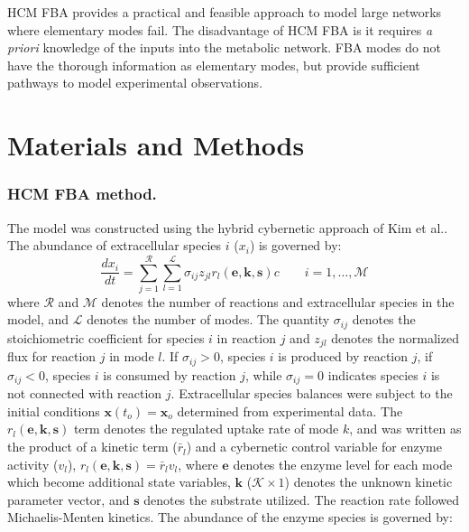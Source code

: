 \documentclass[10pt,twocolumn,twoside,final]{IEEEtran}
\begin{document}
HCM FBA provides a practical and feasible approach to model large networks where elementary modes fail.
The disadvantage of HCM FBA is it requires \textit{a priori} knowledge of the inputs into the metabolic network.
FBA modes do not have the thorough information as elementary modes, but provide sufficient pathways to model experimental observations.

\section{Materials and Methods}

\noindent\subsubsection*{HCM FBA method.}
The model was constructed using the hybrid cybernetic approach of Kim et al.\cite{2008_kim_varner_ramkrishna_BiotechProg}.
The abundance of extracellular species $i$ ($x_{i}$) is governed by:
\begin{equation}
	\frac{dx_{i}}{dt}  =  \sum_{j = 1}^{\mathcal{R}}\sum_{l = 1}^{\mathcal{L}}\sigma_{ij}z_{jl}r_{l}\left(\mathbf{e},\mathbf{k},\mathbf{s}\right)c \qquad{i=1,\hdots,\mathcal{M}}
\end{equation}
where $\mathcal{R}$ and $\mathcal{M}$ denotes the number of reactions and extracellular species in the model, and $\mathcal{L}$ denotes the number of modes.
The quantity $\sigma_{ij}$ denotes the stoichiometric coefficient for species $i$ in reaction $j$ and
$z_{jl}$ denotes the normalized flux for reaction $j$ in mode $l$.
If $\sigma_{ij}>0$, species $i$ is produced by reaction $j$, if $\sigma_{ij}<0$, species $i$ is consumed by reaction $j$, while $\sigma_{ij} = 0$ indicates species $i$ is not connected with reaction $j$.
Extracellular species balances were subject to the initial conditions $\mathbf{x}\left(t_{o}\right) = \mathbf{x}_{o}$ determined from experimental data.
The $r_{l}\left(\mathbf{e},\mathbf{k},\mathbf{s}\right)$ term denotes the regulated uptake rate of mode $k$, and was written as the product of a kinetic term ($\bar{r}_{l}$) and a cybernetic control variable for enzyme activity ($v_{l}$), $r_{l}\left(\mathbf{e},\mathbf{k},\mathbf{s}\right) = \bar{r}_{l}v_{l}$, where $\mathbf{e}$ denotes the enzyme level for each mode which become additional state variables, $\mathbf{k}$ ($\mathcal{K}\times{1}$) denotes the unknown kinetic parameter vector, and $\mathbf{s}$ denotes the substrate utilized. The reaction rate followed Michaelis-Menten kinetics. The abundance of the enzyme species is governed by:
\end{document}

